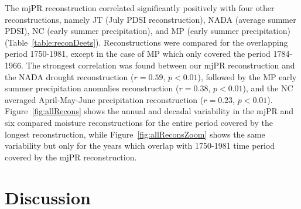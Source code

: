 The mjPR reconstruction correlated significantly positively with four other reconstructions, namely JT (July PDSI reconstruction), NADA (average summer PDSI), NC (early summer precipitation), and MP (early summer precipitation) (Table~\ref{table:reconDeets}). Reconstructions were compared for the overlapping period 1750-1981, except in the case of MP which only covered the period 1784-1966. The strongest correlation was found between our mjPR reconstruction and the NADA drought reconstruction ($r=0.59$, $p < 0.01$), followed by the MP early summer precipitation anomalies reconstruction ($r=0.38$, $p<0.01$), and the NC averaged April-May-June precipitation reconstruction ($r=0.23$, $p<0.01$). Figure~\ref{fig:allRecons} shows the annual and decadal variability in the mjPR and six compared moisture reconstructions for the entire period covered by the longest reconstruction, while Figure~\ref{fig:allReconsZoom} shows the same variability but only for the years which overlap with 1750-1981 time period covered by the mjPR reconstruction. 


\section{Discussion}


